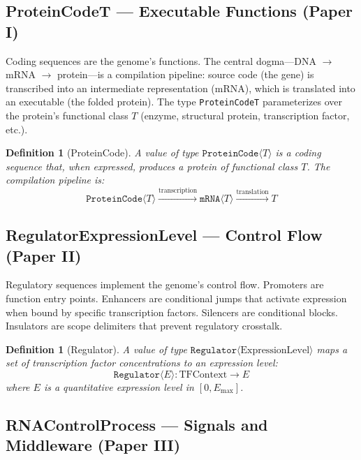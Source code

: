 \documentclass[12pt,a4paper]{article}
\newtheorem{definition}[theorem]{Definition}
\newcommand{\ty}[1]{\texttt{#1}}
\begin{document}
\subsection{ProteinCode\textlangle T\textrangle{} --- Executable Functions (Paper I)}

Coding sequences are the genome's functions. The central dogma---DNA $\to$ mRNA $\to$ protein---is a compilation pipeline: source code (the gene) is transcribed into an intermediate representation (mRNA), which is translated into an executable (the folded protein). The type \ty{ProteinCode\textlangle T\textrangle} parameterizes over the protein's functional class $T$ (enzyme, structural protein, transcription factor, etc.).

\begin{definition}[ProteinCode]
A value of type $\ty{ProteinCode}\langle T \rangle$ is a coding sequence that, when expressed, produces a protein of functional class $T$. The compilation pipeline is:
\[
\ty{ProteinCode}\langle T \rangle \xrightarrow{\text{transcription}} \ty{mRNA}\langle T \rangle \xrightarrow{\text{translation}} T
\]
\end{definition}

\subsection{Regulator\textlangle ExpressionLevel\textrangle{} --- Control Flow (Paper II)}

Regulatory sequences implement the genome's control flow. Promoters are function entry points. Enhancers are conditional jumps that activate expression when bound by specific transcription factors. Silencers are conditional blocks. Insulators are scope delimiters that prevent regulatory crosstalk.

\begin{definition}[Regulator]
A value of type $\ty{Regulator}\langle \text{ExpressionLevel} \rangle$ maps a set of transcription factor concentrations to an expression level:
\[
\ty{Regulator}\langle E \rangle : \text{TFContext} \to E
\]
where $E$ is a quantitative expression level in $[0, E_{\max}]$.
\end{definition}

\subsection{RNAControl\textlangle Process\textrangle{} --- Signals and Middleware (Paper III)}
\end{document}
